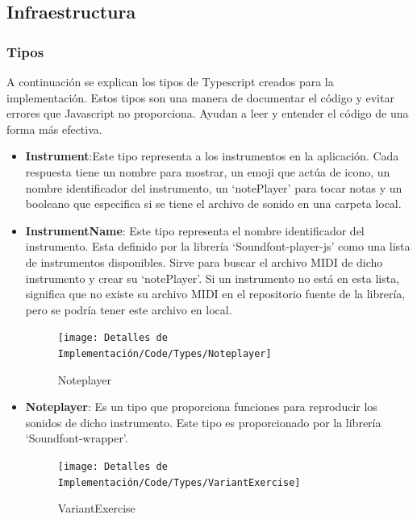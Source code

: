 \documentclass[12pt,twoside,titlepage]{report}
\begin{document}
\subsection{Infraestructura}

\subsubsection{Tipos}

A continuación se explican los tipos de Typescript creados para la implementación. Estos tipos son una manera de documentar el código y evitar errores que Javascript no proporciona. Ayudan a leer y entender el código de una forma más efectiva.

\begin{itemize}
    \begin{figure}[H]
        \centering
        \texttt{[image: Detalles de Implementación/Code/Types/Instrument]}
        \label{fig:Instrument}
        \caption{Instrument}
    \end{figure}

    \item \textbf{Instrument}:Este tipo representa a los instrumentos en la aplicación. Cada respuesta tiene un nombre para mostrar, un emoji que actúa de icono, un nombre identificador del instrumento, un ‘notePlayer’ para tocar notas y un booleano que especifica si se tiene el archivo de sonido en una carpeta local.
    \item \textbf{InstrumentName}: Este tipo representa el nombre identificador del instrumento. Esta definido por la librería ‘Soundfont-player-js’ como una lista de instrumentos disponibles. Sirve para buscar el archivo MIDI de dicho instrumento y crear su ‘notePlayer’. Si un instrumento no está en esta lista, significa que no existe su archivo MIDI en el repositorio fuente de la librería, pero se podría tener este archivo en local.
    
    \begin{figure}[H]
        \centering
        \texttt{[image: Detalles de Implementación/Code/Types/Noteplayer]}
        \label{fig:Noteplayer}
        \caption{Noteplayer}
    \end{figure}

    \item \textbf{Noteplayer}: Es un tipo que proporciona funciones para reproducir los sonidos de dicho instrumento. Este tipo es proporcionado por la librería ‘Soundfont-wrapper’.

    \begin{figure}[H]
        \centering
        \texttt{[image: Detalles de Implementación/Code/Types/VariantExercise]}
        \label{fig:VariantExercise}
        \caption{VariantExercise}
    \end{figure}


\end{itemize}
\end{document}
